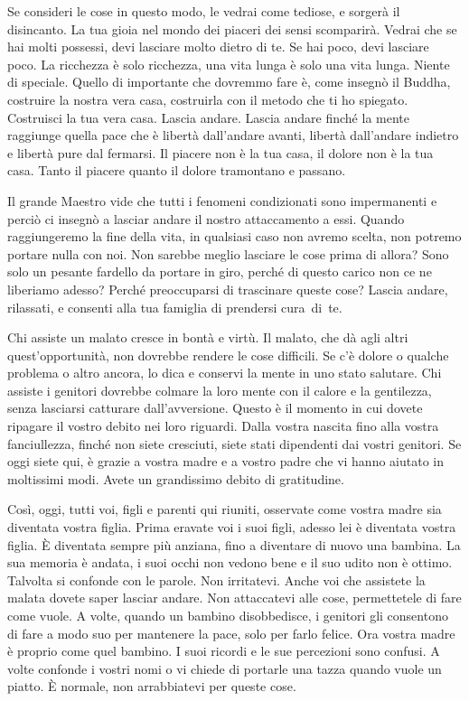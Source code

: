 Se consideri le cose in questo modo, le vedrai come tediose, e sorgerà
il disincanto. La tua gioia nel mondo dei piaceri dei sensi scomparirà.
Vedrai che se hai molti possessi, devi lasciare molto dietro di te. Se
hai poco, devi lasciare poco. La ricchezza è solo ricchezza, una vita
lunga è solo una vita lunga. Niente di speciale. Quello di importante
che dovremmo fare è, come insegnò il Buddha, costruire la nostra vera
casa, costruirla con il metodo che ti ho spiegato. Costruisci la tua
vera casa. Lascia andare. Lascia andare finché la mente raggiunge quella
pace che è libertà dall'andare avanti, libertà dall'andare indietro e
libertà pure dal fermarsi. Il piacere non è la tua casa, il dolore non è
la tua casa. Tanto il piacere quanto il dolore tramontano e passano.

Il grande Maestro vide che tutti i fenomeni condizionati sono
impermanenti e perciò ci insegnò a lasciar andare il nostro attaccamento
a essi. Quando raggiungeremo la fine della vita, in qualsiasi caso non
avremo scelta, non potremo portare nulla con noi. Non sarebbe meglio
lasciare le cose prima di allora? Sono solo un pesante fardello da
portare in giro, perché di questo carico non ce ne liberiamo adesso?
Perché preoccuparsi di trascinare queste cose? Lascia andare, rilassati,
e consenti alla tua famiglia di prendersi cura~di~te.

Chi assiste un malato cresce in bontà e virtù. Il malato, che dà agli
altri quest'opportunità, non dovrebbe rendere le cose difficili. Se c'è
dolore o qualche problema o altro ancora, lo dica e conservi la mente in
uno stato salutare. Chi assiste i genitori dovrebbe colmare la loro
mente con il calore e la gentilezza, senza lasciarsi catturare
dall'avversione. Questo è il momento in cui dovete ripagare il vostro
debito nei loro riguardi. Dalla vostra nascita fino alla vostra
fanciullezza, finché non siete cresciuti, siete stati dipendenti dai
vostri genitori. Se oggi siete qui, è grazie a vostra madre e a vostro
padre che vi hanno aiutato in moltissimi modi. Avete un grandissimo
debito di gratitudine.

Così, oggi, tutti voi, figli e parenti qui riuniti, osservate come
vostra madre sia diventata vostra figlia. Prima eravate voi i suoi
figli, adesso lei è diventata vostra figlia. È diventata sempre più
anziana, fino a diventare di nuovo una bambina. La sua memoria è andata,
i suoi occhi non vedono bene e il suo udito non è ottimo. Talvolta si
confonde con le parole. Non irritatevi. Anche voi che assistete la
malata dovete saper lasciar andare. Non attaccatevi alle cose,
permettetele di fare come vuole. A volte, quando un bambino
disobbedisce, i genitori gli consentono di fare a modo suo per mantenere
la pace, solo per farlo felice. Ora vostra madre è proprio come quel
bambino. I suoi ricordi e le sue percezioni sono confusi. A volte
confonde i vostri nomi o vi chiede di portarle una tazza quando vuole un
piatto. È normale, non arrabbiatevi per queste cose.

